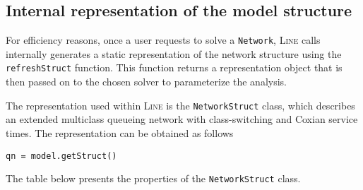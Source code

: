 \subsection{Internal representation of the model structure}
For efficiency reasons, once a user requests to solve a \texttt{Network}, \textsc{Line} calls internally generates a static representation of the network structure using the \texttt{refreshStruct} function. This function returns a representation object that is then passed on to the chosen solver to parameterize the analysis.

The representation used within \textsc{Line} is the \texttt{NetworkStruct} class, which describes an extended multiclass queueing network with class-switching and Coxian service times. The representation can be obtained as follows
\begin{lstlisting}
qn = model.getStruct()
\end{lstlisting}
The table below presents the properties of the \texttt{NetworkStruct} class.


